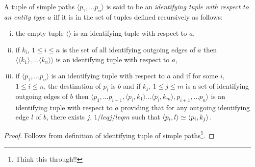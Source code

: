 \documentclass[10pt,a4paper]{article}
\newcommand{\simplepath}[2]{
\ncline[linestyle=dotted,linewidth=0.1pt]{#1}{#2}
\ncput[npos=0.05]{\pnode{dot#21}}
\ncput[npos=0.27]{\dotnode[dotsize=1pt]{dot#22}}
\ncput[npos=0.50]{\dotnode[dotsize=1pt]{dot#23}}
\ncput[npos=0.80]{\dotnode[dotsize=1pt]{dot#24}}
\ncput[npos=0.975]{\pnode{dot#25}}
\ncline[nodesep=3pt]{->}{dot#21}{dot#22}
\ncline[nodesep=3pt]{->}{dot#22}{dot#23}
\ncline[nodesep=3pt]{->}{dot#24}{dot#25}
\ncline[linestyle=dotted,nodesep=10pt]{dot#23}{dot#24}
}
\newcommand{\simplepatha}[3]{
\simplepath{#2}{#3}
\naput[labelsep=1pt]{#1}
}
\newcommand{\simplepathb}[3]{
\simplepath{#2}{#3}
\nbput[labelsep=1pt]{#1}
}
\newcommand{\term}[1]{\textit{{#1}}}
\begin{document}
\begin{definition}
A tuple of simple paths $\langle p_1,...p_n \rangle$ is said to be an 
\term{identifying tuple with respect to an entity type $a$}
iff it is in the set of tuples defined recursively as follows:
\begin{enumerate}[(i)]
\item{
the empty tuple $\langle \rangle$ is an identifying tuple with respect to $a$,
}

\item{
if $k_i$, $1 \leq i \leq n$ is the set of all identifying outgoing edges of $a$ then
$\langle \langle k_1 \rangle ,... \langle k_n \rangle \rangle$ is an identifying tuple with respect to $a$,
}

\item{
if $\langle p_1,...p_n \rangle$ is an identifying tuple with respect to $a$ and if for some $i$, $1 \leq i \leq n$, the
destination of $p_i$ is $b$ and if $k_j$, $1 \leq j \leq m$ is a set of  identifying outgoing edges of $b$
then $\langle p_1,...p_{i-1},\langle p_i,k_1 \rangle ... \langle p_i,k_m \rangle, p_{i+1},...p_n \rangle$ is an identifying tuple with respect to $a$ providing that for any outgoing identifying edge $l$ of $b$, there exists $j$, $1 /leq j /leq m$ such that 
 $\langle p_i,l\rangle \simeq \langle p_i,k_j\rangle$.
}

\end{enumerate}

\end{definition}

\begin{proof}
Follows from definition of identifying tuple of simple paths\footnote{Think this through!!}.
\end{proof}
\end{document}
